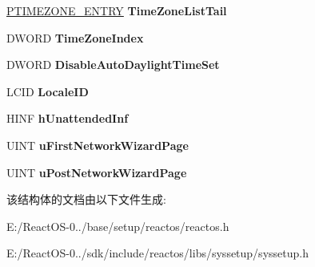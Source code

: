 \begin{DoxyCompactItemize}
\item 
\mbox{\label{struct___s_e_t_u_p_d_a_t_a_a1885e87f90e66df7b95958d4e5047949}} 
\hyperlink{struct___t_i_m_e_z_o_n_e___e_n_t_r_y}{P\+T\+I\+M\+E\+Z\+O\+N\+E\+\_\+\+E\+N\+T\+RY} {\bfseries Time\+Zone\+List\+Tail}
\item 
\mbox{\label{struct___s_e_t_u_p_d_a_t_a_a1543f3d55af9fbae7439f6ddc1a874f5}} 
D\+W\+O\+RD {\bfseries Time\+Zone\+Index}
\item 
\mbox{\label{struct___s_e_t_u_p_d_a_t_a_ae3000a7f746a2b7b0dfe705c7c4cafcc}} 
D\+W\+O\+RD {\bfseries Disable\+Auto\+Daylight\+Time\+Set}
\item 
\mbox{\label{struct___s_e_t_u_p_d_a_t_a_a13bc1aeb89f11b2d6f3698beaf3c80ab}} 
L\+C\+ID {\bfseries Locale\+ID}
\item 
\mbox{\label{struct___s_e_t_u_p_d_a_t_a_ac7b5f173b50b2266bc717faca2670875}} 
H\+I\+NF {\bfseries h\+Unattended\+Inf}
\item 
\mbox{\label{struct___s_e_t_u_p_d_a_t_a_a8472e61d73140ea3a8b1c5ef2d27f659}} 
U\+I\+NT {\bfseries u\+First\+Network\+Wizard\+Page}
\item 
\mbox{\label{struct___s_e_t_u_p_d_a_t_a_a44290d1f89250aa0d8b0324165903246}} 
U\+I\+NT {\bfseries u\+Post\+Network\+Wizard\+Page}
\end{DoxyCompactItemize}


该结构体的文档由以下文件生成\+:\begin{DoxyCompactItemize}
\item 
E\+:/\+React\+O\+S-\/0../base/setup/reactos/reactos.\+h\item 
E\+:/\+React\+O\+S-\/0../sdk/include/reactos/libs/syssetup/syssetup.\+h\end{DoxyCompactItemize}
